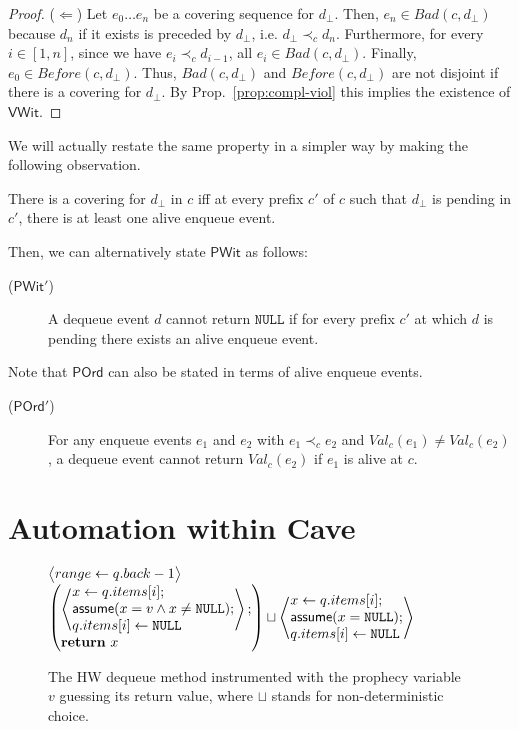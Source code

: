 \documentclass{LMCS}
\makeatletter
\newcommand{\NULL}{\ensuremath{\mathtt{NULL}}}
\newcommand{\deq}{\ensuremath{\mathtt{deq}}}
\newcommand{\assume}{\mathsf{assume}}
\newcommand{\ndchoice}{\sqcup}
\newcommand{\Before}[2]{\ensuremath{\mathit{Before}({#1},{#2})}}
\newcommand{\Val}[2]{\ensuremath{\mathit{Val}_{#1}({#2})}}
\newcommand{\Bad}[2]{\ensuremath{\mathit{Bad}(#1,#2)}}
\newcommand{\dhat}{\ensuremath{d_{\bot}}}
\newcommand\inpar[1]{\left(\begin{array}{@{}l@{}}#1\end{array}\right)}
\newcommand\inatom[1]{\left\langle\begin{array}{@{}l@{}}#1\end{array}\right\rangle}
\newcommand{\VWit}{\ensuremath{\mathsf{VWit}}}
\newcommand{\POrd}{\ensuremath{\mathsf{POrd}}}
\newcommand{\PWit}{\ensuremath{\mathsf{PWit}}}
\makeatother
\begin{document}
\begin{proof}
($\Leftarrow$)
Let $e_0\ldots e_n$ be a covering sequence for $\dhat$.
Then, $e_n\in \Bad c {\dhat}$ because $d_n$ if it exists is preceded by $\dhat$, i.e. $\dhat\prec_c d_n$.
Furthermore, for every $i\in[1,n]$, since we have $e_i\prec_c d_{i-1}$, all $e_i\in \Bad c {\dhat}$.
Finally, $e_0\in \Before c {\dhat}$. 
Thus, $\Bad c {\dhat}$ and $\Before c {\dhat}$ are not disjoint if there is a covering for $\dhat$.
By Prop.~\ref{prop:compl-viol} this implies the existence of {\VWit}.
\end{proof}

\noindent
We will actually restate the same property in a simpler way by making the
following observation.
\begin{prop}
There is a covering for $\dhat$ in $c$ iff at every prefix $c'$ of $c$ such that
$\dhat$ is pending in $c'$, there is at least one alive enqueue event.
\end{prop}

\noindent
Then, we can alternatively state {\PWit} as follows:
\begin{description}
\item[($\PWit'$)] A dequeue event $d$ cannot return {\NULL} if for every prefix $c'$ at which $d$ is pending there exists an alive enqueue event.
\end{description}
Note that {\POrd} can also be stated in terms of alive enqueue events. 
\begin{description}
\item[($\POrd'$)] For any enqueue events $e_1$ and $e_2$ with $e_1 \prec_c e_2$ and \mbox{$\Val{c}{e_1}\neq\Val{c}{e_2}$},
a dequeue event cannot return $\Val{c}{e_2}$ if $e_1$ is alive at $c$.
\end{description}

\section{Automation within Cave}
\label{sec:cave}

\begin{figure}[t]
\begin{algorithmic}
 \Procedure{$\deq$}{$v : val$}
   \State $\inatom{ range\gets q.back-1 }$
  \State 
$\inpar{\inatom{
    x\gets q.items[i] ;
  \\ \assume(x = v \land x \neq \NULL) ;
  \\ q.items[i] \gets \NULL } ;
  \\ \mathbf{return}\ x}
\ndchoice
\inatom{
   x\gets q.items[i] ;
\\ \assume(x = \NULL) ;
\\ q.items[i] \gets \NULL
}
$
  \EndFor
 \EndWhile
 \EndProcedure
\end{algorithmic}
\caption{The HW dequeue method instrumented with the prophecy variable $v$ guessing
its return value, where $\ndchoice$ stands for non-deterministic choice.}
\label{fig:instr-deq}
\end{figure}
\end{document}
